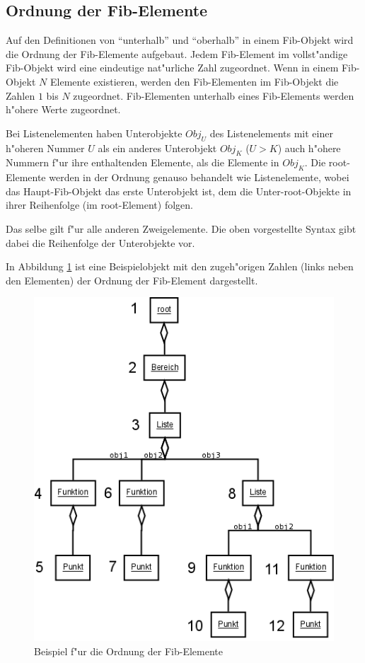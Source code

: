 \subsection{Ordnung der Fib-Elemente}
\label{secOrderFibElements}

Auf den Definitionen von ``unterhalb'' und ``oberhalb'' in einem Fib-Objekt wird die Ordnung der Fib-Elemente aufgebaut. Jedem Fib-Element im vollst"andige Fib-Objekt wird eine eindeutige nat"urliche Zahl zugeordnet. Wenn in einem Fib-Objekt $N$ Elemente existieren, werden den Fib-Elementen im Fib-Objekt die Zahlen $1$ bis $N$ zugeordnet. Fib-Elementen unterhalb eines Fib-Elements werden h"ohere Werte zugeordnet.

Bei Listenelementen haben Unterobjekte $Obj_U$ des Listenelements mit einer h"oheren Nummer $U$ als ein anderes Unterobjekt $Obj_K$ ($U>K$) auch h"ohere Nummern f"ur ihre enthaltenden Elemente, als die Elemente in $Obj_K$. Die root-Elemente werden in der Ordnung genauso behandelt wie Listenelemente, wobei das Haupt-Fib-Objekt das erste Unterobjekt ist, dem die Unter-root-Objekte in ihrer Reihenfolge (im root-Element) folgen.

Das selbe gilt f"ur alle anderen Zweigelemente. Die oben vorgestellte Syntax gibt dabei die Reihenfolge der Unterobjekte vor.

In Abbildung \ref{figOrderFibElements} ist eine Beispielobjekt mit den zugeh"origen Zahlen (links neben den Elementen) der Ordnung der Fib-Element dargestellt.

\begin{figure}[htbp]
\begin{center}
  \includegraphics[scale=0.5]{order_elements}
\end{center}
\caption{Beispiel f"ur die Ordnung der Fib-Elemente}
\label{figOrderFibElements}
\end{figure}



